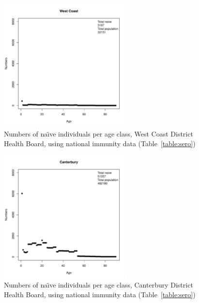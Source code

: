 \documentclass{article}
\begin{document}
\begin{figure}[H]
     \begin{center}
     \includegraphics[width=0.6\textwidth]{dhb17.pdf}
     \end{center}
     \caption{Numbers of na\"{\i}ve individuals per age class, West Coast District Health Board, using national immunity data (Table~\autoref{table:sero})}
     \label{fig:WestCoast}
\end{figure}

\begin{figure}[H]
   \begin{center}
     \includegraphics[width=0.6\textwidth]{dhb18.pdf}
     \end{center}
     \caption{Numbers of na\"{\i}ve individuals per age class, Canterbury District Health Board, using national immunity data (Table~\autoref{table:sero})}
     \label{fig:Canterbury}
\end{figure}
\end{document}
